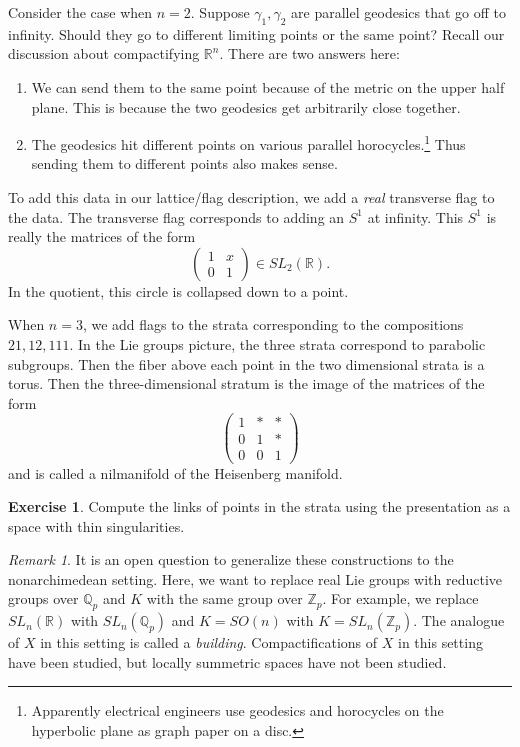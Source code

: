 \documentclass[leqno, openany]{memoir}
\theoremstyle{definition}
\newtheorem{exer}[thm]{Exercise}
\theoremstyle{remark}
\newtheorem{rmk}[thm]{Remark}
\theoremstyle{plain}
\theoremstyle{definition}
\theoremstyle{remark}
\newcommand{\R}{\mathbb{R}}
\newcommand{\Z}{\mathbb{Z}}
\newcommand{\Q}{\mathbb{Q}}
\begin{document}
Consider the case when $n=2$. Suppose $\gamma_1, \gamma_2$ are parallel geodesics that go off to infinity. Should they go to different limiting points or the same point? Recall our discussion about compactifying $\R^n$. There are two answers here:
\begin{enumerate}
    \item We can send them to the same point because of the metric on the upper half plane. This is because the two geodesics get arbitrarily close together.
    \item The geodesics hit different points on various parallel horocycles.\footnote{Apparently electrical engineers use geodesics and horocycles on the hyperbolic plane as graph paper on a disc.} Thus sending them to different points also makes sense.
\end{enumerate}
To add this data in our lattice/flag description, we add a \textit{real} transverse flag to the data. The transverse flag corresponds to adding an $S^1$ at infinity. This $S^1$ is really the matrices of the form
\[ \begin{pmatrix}
    1 & x \\ 0 & 1
\end{pmatrix} \in SL_2(\R). \]
In the quotient, this circle is collapsed down to a point.

When $n=3$, we add flags to the strata corresponding to the compositions $21,12,111$. In the Lie groups picture, the three strata correspond to parabolic subgroups. Then the fiber above each point in the two dimensional strata is a torus. Then the three-dimensional stratum is the image of the matrices of the form
\[ \begin{pmatrix}
    1 & * & * \\
    0 & 1 & * \\
    0 & 0 & 1
\end{pmatrix} \]
and is called a nilmanifold of the Heisenberg manifold.

\begin{exer}
    Compute the links of points in the strata using the presentation as a space with thin singularities.
\end{exer}

\begin{rmk}
    It is an open question to generalize these constructions to the nonarchimedean setting. Here, we want to replace real Lie groups with reductive groups over $\Q_p$ and $K$ with the same group over $\Z_p$. For example, we replace $SL_n(\R)$ with $SL_n(\Q_p)$ and $K = SO(n)$ with $K=SL_n(\Z_p)$. The analogue of $X$ in this setting is called a \textit{building}. Compactifications of $X$ in this setting have been studied, but locally summetric spaces have not been studied.
\end{rmk}
\end{document}

